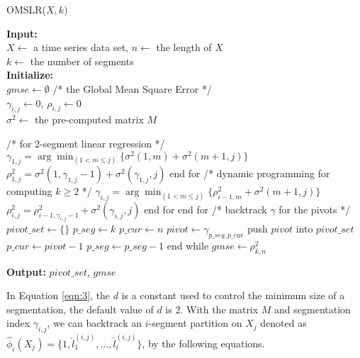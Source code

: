 \documentclass{article}
\begin{document}
\begin{algorithm}[t]
  \caption{OMSLR($X, k$)}\label{algo:OMSLR}
  \hspace*{0.02in} {\bf Input:}\\
  \hspace*{0.18in} $X \gets$ a time series data set, $n \gets$ the length of $X$\\
  \hspace*{0.18in} $k \gets$ the number of segments\\
  \hspace*{0.02in} {\bf Initialize:}\\
  \hspace*{0.18in} $gmse \gets \emptyset$ /* the Global Mean Square Error */\\
  \hspace*{0.18in} $\gamma_{i,j} \gets 0$, $\rho_{i,j} \gets 0$\\
  \hspace*{0.18in} $\sigma^2 \gets$ the pre-computed matrix $M$
  \begin{algorithmic}[1]
    \State /* for 2-segment linear regression */
      \State $\gamma_{1,j} = \arg \min_{(1 < m \leq j)}\{ \sigma^2(1,m) + \sigma^2 (m+1, j)\}$
      \State $\rho^2_{1,j} = \sigma^2(1, \gamma_{1,j}-1) + \sigma^2(\gamma_{1,j}, j)$
    \EndFor
    \State end for
    \State /* dynamic programming for computing $k \geq 2$ */
        \State $\gamma_{i,j} = \arg \min_{(1 < m \leq j)}\{ \rho^2_{i-1,m} + \sigma^2 (m+1, j)\}$
        \State $\rho^2_{i,j} = \rho^2_{i-1,\gamma_{i,j}-1} + \sigma^2(\gamma_{i,j}, j)$
      \EndFor
      \State end for
    \EndFor
    \State end for
    \State /* backtrack $\gamma$ for the pivots */
    \State $pivot\_set \gets \{\}$
    \State $p\_seg \gets k$
    \State $p\_cur \gets n$
    \State $pivot \gets \gamma_{p\_seg, p\_cur}$
    \State push $pivot$ into $pivot\_set$
    \State $p\_cur \gets pivot-1$
    \State $p\_seg \gets p\_seg-1$
    \EndWhile
    \State end while
    \State $gmse \gets \rho^2_{k,n}$
  \end{algorithmic}
  \hspace*{0.02in} {\bf Output:} $pivot\_set$, $gmse$
\end{algorithm}


In Equation \ref{eqn:3}, the $d$ is a constant used to control the minimum size of a segmentation, the default value of $d$ is 2. With the matrix $M$ and segmentation index $\gamma_{i,j}$, we can backtrack an $i$-segment partition on $X_j$ denoted as $ \hat \phi_i(X_j) = \{1, \hat l_1^{(i,j)}, \dots, \hat l_i^{(i,j)} \}$, by the following equations.
\end{document}
